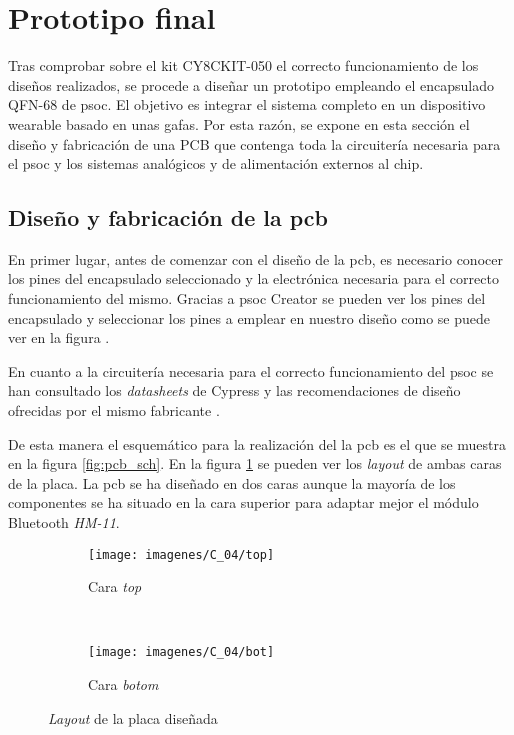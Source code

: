


\section{Prototipo final}

Tras comprobar sobre el kit CY8CKIT-050 el correcto funcionamiento de los diseños realizados, se procede a diseñar un prototipo empleando el encapsulado QFN-68 de \acrshort{psoc}. El objetivo es integrar el sistema completo en un dispositivo wearable basado en unas gafas. Por esta razón, se expone en esta sección el diseño y fabricación de una PCB que contenga toda la circuitería necesaria para el \acrshort{psoc} y los sistemas analógicos y de alimentación externos al chip.

\subsection{Diseño y fabricación de la \acrshort{pcb}}

En primer lugar, antes de comenzar con el diseño de la \acrshort{pcb}, es necesario conocer los pines del encapsulado seleccionado y la electrónica necesaria para el correcto funcionamiento del mismo. Gracias a \acrshort{psoc} Creator se pueden ver los pines del encapsulado y seleccionar los pines a emplear en nuestro diseño como se puede ver en la figura .

En cuanto a la circuitería necesaria para el correcto funcionamiento del \acrshort{psoc} se han consultado los \textit{datasheets} de Cypress \cite{CY_psoc5_dat} y las recomendaciones de diseño ofrecidas por el mismo fabricante \cite{CY_layout,CY_Hardware}. 

De esta manera el esquemático para la realización del la \acrshort{pcb} es el que se muestra en la figura \ref{fig:pcb_sch}. En la figura \ref{fig:Layout} se pueden ver los \textit{layout} de ambas caras de la placa. La \acrshort{pcb} se ha diseñado en dos caras aunque la mayoría de los componentes se ha situado en la cara superior para adaptar mejor el módulo Bluetooth \textit{HM-11}.

\begin{figure}[!ht]
\center
\begin{subfigure}[b]{0.7\textwidth}
\center
\texttt{[image: imagenes/C\_04/top]}
\caption{Cara \textit{top}}
\end{subfigure}
\\
\begin{subfigure}[b]{0.7\textwidth}
\center
\texttt{[image: imagenes/C\_04/bot]}
\caption{Cara \textit{botom}}
\end{subfigure}
\caption{\textit{Layout} de la placa diseñada}
\label{fig:Layout}
\end{figure}

